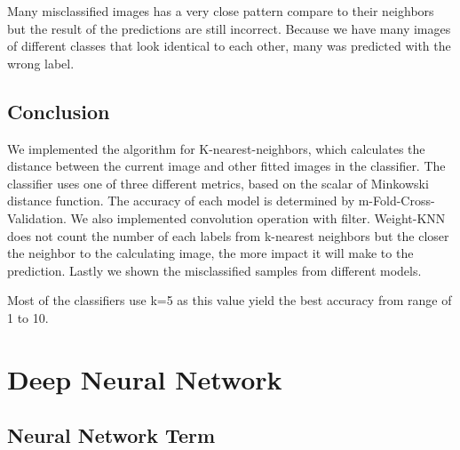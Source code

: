 \documentclass[11pt]{article}
\begin{document}
Many misclassified images has a very close pattern compare to their neighbors but the result of the predictions are still incorrect. Because we have many images of different classes that look identical to each other, many was predicted with the wrong label.

\subsection{Conclusion}

We implemented the algorithm for K-nearest-neighbors, which calculates the distance between the current image and other fitted images in the classifier. The classifier uses one of three different metrics, based on the scalar of Minkowski distance function. The accuracy of each model is determined by m-Fold-Cross-Validation. We also implemented convolution operation with filter. Weight-KNN does not count the number of each labels from k-nearest neighbors but the closer the neighbor to the calculating image, the more impact it will make to the prediction. Lastly we shown the misclassified samples from different models.

Most of the classifiers use k=5 as this value yield the best accuracy from range of 1 to 10.



\section{Deep Neural Network}
\subsection{Neural Network Term}
\end{document}
